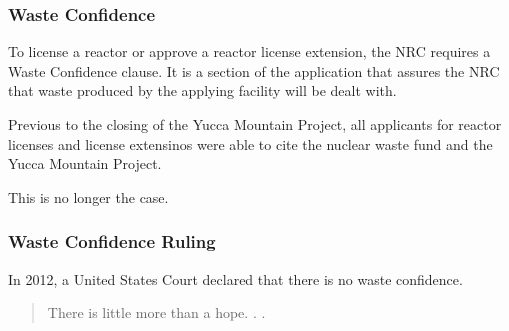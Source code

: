 
\begin{frame}[ctb!]
    \frametitle{Waste Confidence}
    To license a reactor or approve a reactor license extension, the NRC 
    requires a Waste Confidence clause. It is a section of the application that 
    assures the NRC that waste produced by the applying facility will be dealt 
    with. 

    Previous to the closing of the Yucca Mountain Project, all applicants for 
    reactor licenses and license extensinos were able to cite the nuclear waste 
    fund and the Yucca Mountain Project. 

    This is no longer the case. 
  \end{frame}

\begin{frame}[ctb!]
    \frametitle{Waste Confidence Ruling}
    In 2012, a United States Court declared that there is no waste confidence. 
    
    \begin{quotation}
      There is little more than a hope. . .  
    \end{quotation}
  \end{frame}

